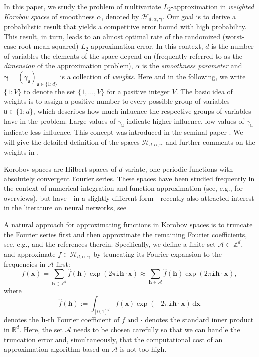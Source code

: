 \documentclass[pdflatex,sn-basic,Numbered]{sn-jnl}%
\newcommand{\rd}{\, \mathrm{d}}
\newcommand{\bsh}{\boldsymbol{h}}
\newcommand{\bsx}{\boldsymbol{x}}
\newcommand{\bsgamma}{\boldsymbol{\gamma}}
\newcommand{\RR}{\mathbb{R}}
\newcommand{\ZZ}{\mathbb{Z}}
\newcommand{\Acal}{\mathcal{A}}
\newcommand{\Hcal}{\mathcal{H}}
\newcommand{\icomp}{\mathtt{i}}
\theoremstyle{thmstyleone}%
\theoremstyle{thmstyletwo}%
\begin{document}
In this paper, we study the problem of multivariate $L_2$-approximation in \textit{weighted Korobov spaces} of smoothness $\alpha$, denoted by $\Hcal_{d,\alpha,\bsgamma}$. Our goal is to derive a probabilistic result that yields a competitive error bound with high probability. This result, in turn, leads to an almost optimal rate of the randomized (worst-case root-mean-squared) $L_2$-approximation error. In this context, $d$ is the number of variables the elements of the space depend on (frequently referred to as the \textit{dimension} of the approximation problem), $\alpha$ is the \textit{smoothness parameter} and $\bsgamma=(\gamma_{\mathfrak{u}})_{\mathfrak{u}\in \{1{:}d\}}$ is a collection of \textit{weights}. Here and in the following, we write $\{1{:}V\}$ to denote the set $\{1,\ldots,V\}$ for a positive integer $V$. The basic idea of weights is to assign a positive number 
to every possible group of variables $\mathfrak{u}\in \{1{:}d\}$, which describes how much influence the respective groups of variables have in the problem. Large values of $\gamma_{\mathfrak{u}}$ indicate higher influence, low values of $\gamma_{\mathfrak{u}}$ indicate less influence. 
This concept was introduced in the seminal paper \cite{sloan1998when}.
We will give the detailed definition of the spaces $\Hcal_{d,\alpha,\bsgamma}$ and further comments on the weights in .

Korobov spaces are Hilbert spaces of $d$-variate, one-periodic functions with absolutely convergent Fourier series. These spaces have been studied frequently in the context of numerical integration and function approximation (see, e.g., \cite{dick2022lattice, kuo2013high, sloan1994lattice} for overviews), but have---in a slightly different form---recently also attracted interest in the literature on neural networks, see \cite{liu2024approx}.

A natural approach for approximating functions in Korobov spaces is to truncate the Fourier series first and then approximate the remaining Fourier coefficients, see, e.g., \cite{kuo2006lattice, novak2004tractability} and the references therein. Specifically, we define a finite set $\Acal\subset\ZZ^d$, and approximate $f\in \Hcal_{d,\alpha,\bsgamma}$ by truncating its Fourier expansion to the frequencies in $\Acal$ first:
\[ f(\bsx)=\sum_{\bsh\in \ZZ^d}\widehat{f}(\bsh)\exp(2\pi \icomp\bsh\cdot \bsx) \approx \sum_{\bsh\in \Acal}\widehat{f}(\bsh)\exp(2\pi \icomp\bsh\cdot \bsx),\]
where 
\[
 \widehat{f}({\bsh}):=\int_{[0,1]^d} f(\bsx) \exp({-2\pi\icomp \bsh\cdot \bsx}) \rd \bsx
\]
denotes the $\bsh$-th Fourier coefficient of $f$ and $\cdot$ denotes the standard inner product in $\RR^d$.
Here, the set $\Acal$ needs to be chosen carefully so that we can handle the truncation error and, simultaneously, that the computational cost of an approximation algorithm based on $\Acal$ is not too high. 
\end{document}
